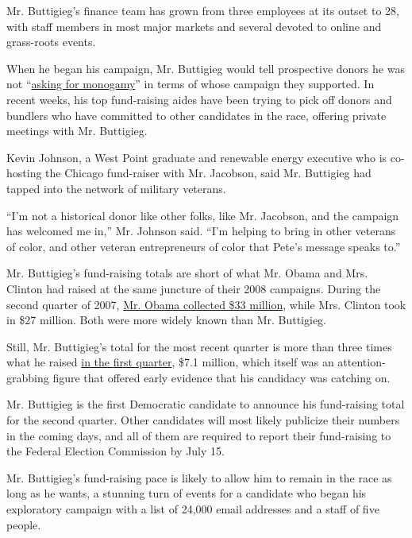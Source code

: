 Mr. Buttigieg's finance team has grown from three employees at its
outset to 28, with staff members in most major markets and several
devoted to online and grass-roots events.

When he began his campaign, Mr. Buttigieg would tell prospective donors
he was not
``\href{https://www.nytimes3xbfgragh.onion/2019/04/30/us/politics/pete-buttigieg-gay-donors.html}{asking
for monogamy}'' in terms of whose campaign they supported. In recent
weeks, his top fund-raising aides have been trying to pick off donors
and bundlers who have committed to other candidates in the race,
offering private meetings with Mr. Buttigieg.

Kevin Johnson, a West Point graduate and renewable energy executive who
is co-hosting the Chicago fund-raiser with Mr. Jacobson, said Mr.
Buttigieg had tapped into the network of military veterans.

``I'm not a historical donor like other folks, like Mr. Jacobson, and
the campaign has welcomed me in,'' Mr. Johnson said. ``I'm helping to
bring in other veterans of color, and other veteran entrepreneurs of
color that Pete's message speaks to.''

Mr. Buttigieg's fund-raising totals are short of what Mr. Obama and Mrs.
Clinton had raised at the same juncture of their 2008 campaigns. During
the second quarter of 2007,
\href{https://www.nytimes3xbfgragh.onion/2007/07/17/us/politics/17obama.html}{Mr.
Obama collected \$33 million}, while Mrs. Clinton took in \$27 million.
Both were more widely known than Mr. Buttigieg.

Still, Mr. Buttigieg's total for the most recent quarter is more than
three times what he raised
\href{https://www.nytimes3xbfgragh.onion/2019/04/01/us/politics/pete-buttiegieg-fundraising.html}{in
the first quarter}, \$7.1 million, which itself was an
attention-grabbing figure that offered early evidence that his candidacy
was catching on.

Mr. Buttigieg is the first Democratic candidate to announce his
fund-raising total for the second quarter. Other candidates will most
likely publicize their numbers in the coming days, and all of them are
required to report their fund-raising to the Federal Election Commission
by July 15.

Mr. Buttigieg's fund-raising pace is likely to allow him to remain in
the race as long as he wants, a stunning turn of events for a candidate
who began his exploratory campaign with a list of 24,000 email addresses
and a staff of five people.

